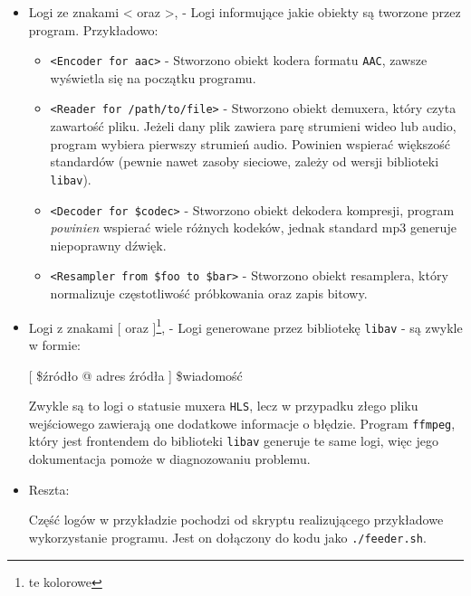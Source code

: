 \documentclass[a4paper,12pt]{article}
\begin{document}
\begin{itemize}
        \item Logi ze znakami < oraz >, - Logi informujące jakie obiekty są
            tworzone przez program. Przykładowo:
            \begin{itemize}
                \item \texttt{<Encoder for aac>} - Stworzono obiekt kodera
                    formatu \texttt{AAC}, zawsze wyświetla się na początku
                    programu.
                \item \texttt{<Reader for /path/to/file>} - Stworzono obiekt
                    demuxera, który czyta zawartość pliku. Jeżeli dany plik
                    zawiera parę strumieni wideo lub audio, program wybiera
                    pierwszy strumień audio. Powinien wspierać większość
                    standardów (pewnie nawet zasoby sieciowe, zależy od wersji
                    biblioteki \texttt{libav}).
                \item \texttt{<Decoder for \$codec>} - Stworzono obiekt dekodera
                    kompresji, program \emph{powinien} wspierać wiele różnych
                    kodeków, jednak standard mp3 generuje niepoprawny dźwięk.
                \item \texttt{<Resampler from \$foo to \$bar>} - Stworzono
                    obiekt resamplera, który normalizuje częstotliwość
                    próbkowania oraz zapis bitowy.
            \end{itemize}
        \item Logi z znakami [ oraz ]\footnote{te kolorowe}, - Logi generowane przez bibliotekę
            \texttt{libav} - są zwykle w formie:

            \begin{center}
                [ \$źródło @ adres źródła ] \$wiadomość
            \end{center}
            
            Zwykle są to logi o statusie muxera \texttt{HLS}, lecz w przypadku
            złego pliku wejściowego zawierają one dodatkowe informacje o
            błędzie. Program \texttt{ffmpeg}, który jest frontendem do
            biblioteki \texttt{libav} generuje te same logi, więc jego
            dokumentacja pomoże w diagnozowaniu problemu.

        \item Reszta:

            Część logów w przykładzie pochodzi od skryptu realizującego
            przykładowe wykorzystanie programu. Jest on dołączony do kodu jako
            \texttt{./feeder.sh}.
\end{itemize}
\end{document}
